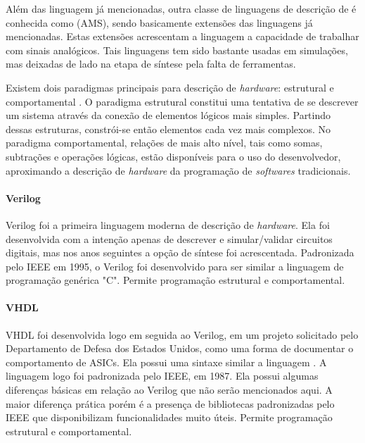 \documentclass[11pt,a4paper,oneside]{book}
\begin{document}
Al\'em das linguagem j\'a mencionadas, outra classe de linguagens de descri\c{c}\~ao de  \'e conhecida como  (AMS), sendo basicamente extens\~oes das linguagens j\'a mencionadas.
Estas extens\~oes acrescentam a linguagem a capacidade de trabalhar com sinais anal\'ogicos.
Tais linguagens tem sido bastante usadas em simula\c{c}\~oes, mas deixadas de lado na etapa de s\'i­ntese pela falta de ferramentas.

Existem dois paradigmas principais para descrição de \textit{hardware}: estrutural e comportamental \cite{Thomas1996}.
O paradigma estrutural constitui uma tentativa de se descrever um sistema através da conexão de elementos lógicos mais simples.
Partindo dessas estruturas, constrói-se então elementos cada vez mais complexos.
No paradigma comportamental, relações de mais alto nível, tais como somas, subtrações e operações lógicas, estão disponíveis para o uso do desenvolvedor, aproximando a descrição de \textit{hardware} da programação de \textit{softwares} tradicionais.

\paragraph{Verilog}
Verilog foi a primeira linguagem moderna de descri\c{c}\~ao de \textit{hardware}.
Ela foi desenvolvida com a inten\c{c}\~ao apenas de descrever e simular/validar circuitos digitais, mas nos anos seguintes a op\c{c}\~ao de s\'i­ntese foi acrescentada.
Padronizada pelo IEEE em 1995, o Verilog foi desenvolvido para ser similar a linguagem de programa\c{c}\~ao gen\'erica "C".
Permite programação estrutural e comportamental.

\paragraph{VHDL}
VHDL foi desenvolvida logo em seguida ao Verilog, em um projeto solicitado pelo Departamento de Defesa dos Estados Unidos, como uma forma de documentar o comportamento de ASICs.
Ela possui uma sintaxe similar a linguagem .
A linguagem logo foi padronizada pelo IEEE, em 1987.
Ela possui algumas diferen\c{c}as b\'asicas em rela\c{c}\~ao ao Verilog que n\~ao ser\~ao mencionados aqui.
A maior diferen\c{c}a pr\'atica por\'em \'e a presen\c{c}a de bibliotecas padronizadas pelo IEEE que disponibilizam funcionalidades muito \'uteis.
Permite programação estrutural e comportamental.
\end{document}
